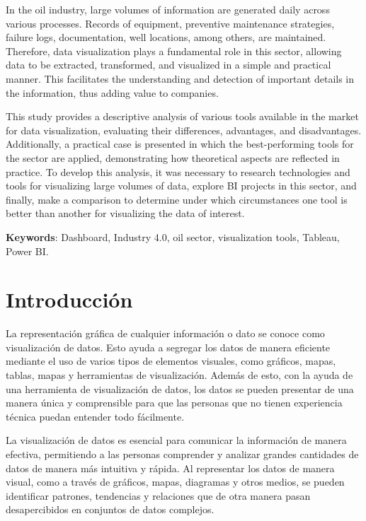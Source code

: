 \documentclass[
  11pt,
  bookmarksnumbered]{article}
\begin{document}
In the oil industry, large volumes of information are generated daily across various processes.
Records of equipment, preventive maintenance strategies, failure logs, documentation, well locations, among others, are maintained.
Therefore, data visualization plays a fundamental role in this sector, allowing data to be extracted, transformed, and visualized in a simple and practical manner.
This facilitates the understanding and detection of important details in the information, thus adding value to companies.

This study provides a descriptive analysis of various tools available in the market for data visualization, evaluating their differences, advantages, and disadvantages.
Additionally, a practical case is presented in which the best-performing tools for the sector are applied, demonstrating how theoretical aspects are reflected in practice.
To develop this analysis, it was necessary to research technologies and tools for visualizing large volumes of data, explore BI projects in this sector, and finally, make a comparison to determine under which circumstances one tool is better than another for visualizing the data of interest.

\textbf{Keywords}: Dashboard, Industry 4.0, oil sector, visualization tools, Tableau, Power BI.

\newpage

\hypertarget{introducciuxf3n}{%
\section{\texorpdfstring{\textbf{Introducción}}{Introducción}}\label{introducciuxf3n}}

La representación gráfica de cualquier información o dato se conoce como visualización de datos.
Esto ayuda a segregar los datos de manera eficiente mediante el uso de varios tipos de elementos visuales, como gráficos, mapas, tablas, mapas y herramientas de visualización.
Además de esto, con la ayuda de una herramienta de visualización de datos, los datos se pueden presentar de una manera única y comprensible para que las personas que no tienen experiencia técnica puedan entender todo fácilmente.

La visualización de datos es esencial para comunicar la información de manera efectiva, permitiendo a las personas comprender y analizar grandes cantidades de datos de manera más intuitiva y rápida.
Al representar los datos de manera visual, como a través de gráficos, mapas, diagramas y otros medios, se pueden identificar patrones, tendencias y relaciones que de otra manera pasan desapercibidos en conjuntos de datos complejos.
\end{document}
